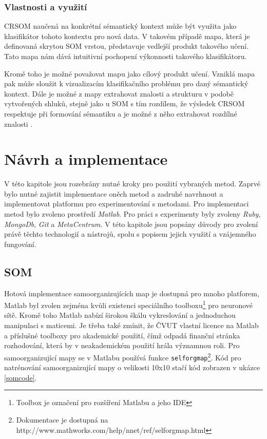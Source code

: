 \documentclass[thesis=M,czech]{FITthesis}[2012/06/26]
\begin{document}
\subsection{Vlastnosti a využití}

	CRSOM naučená na konkrétní sémantický kontext může být využita jako klasifikátor tohoto kontextu pro nová data. V takovém případě mapa, která je definovaná skrytou SOM vrstou, představuje vedlejší produkt takového učení. Tato mapa nám dává intuitivní pochopení výkonnosti takového klasifikátoru.

Kromě toho je možné považovat mapu jako cílový produkt učení. Vzniklá mapa pak může sloužit k vizualizacím klasifikačního problému pro daný sémantický kontext. Dále je možné z mapy extrahovat znalosti a strukturu v podobě vytvořených shluků, stejně jako u SOM s tím rozdílem, že výsledek CRSOM respektuje při formování sémantiku a je možné z něho extrahovat rozdílné znalosti \cite{lms}.

\chapter{Návrh a implementace}
V této kapitole jsou rozebrány nutné kroky pro použití vybraných metod. Zaprvé bylo nutné zajistit implementace oněch metod a zadruhé navrhnout a implementovat platformu pro experimentování s metodami. Pro implementaci metod bylo zvoleno prostředí \textit{Matlab}. Pro práci s experimenty byly zvoleny \textit{Ruby}, \textit{MongoDb}, \textit{Git} a \textit{MetaCentrum}. V této kapitole jsou popsány důvody pro zvolení právě těchto technologií a nástrojů, spolu s popisem jejich využití a vzájemného fungování. 


\section{SOM}
Hotová implementace samoorganizujících map je dostupná pro mnoho platforem, Matlab byl zvolen zejména kvůli existenci speciálního toolboxu\footnote{Toolbox je označení pro rozšíření Matlabu a jeho IDE} pro neuronové sítě. Kromě toho Matlab nabízí širokou škálu vykreslování a jednoduchou manipulaci s maticemi. Je třeba také zmínit, že ČVUT vlastní licence na Matlab a příslušné toolboxy pro akademické použití, čímž odpadá finanční stránka rozhodování, která by v neakademickém použití hrála významnou roli.
Pro samoorganizující mapy se v Matlabu používá funkce \texttt{selforgmap}\footnote{Dokumentace je dostupná na http://www.mathworks.com/help/nnet/ref/selforgmap.html}. Kód pro natrénování samoorganizující mapy o velikosti 10x10 stačí kód zobrazen v ukázce \ref{somcode}.
\end{document}
